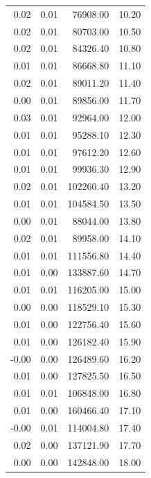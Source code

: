 \begin{tabular}{rrrr}
0.02 & 0.01 & 76908.00 & 10.20 \\
0.02 & 0.01 & 80703.00 & 10.50 \\
0.02 & 0.01 & 84326.40 & 10.80 \\
0.01 & 0.01 & 86668.80 & 11.10 \\
0.02 & 0.01 & 89011.20 & 11.40 \\
0.00 & 0.01 & 89856.00 & 11.70 \\
0.03 & 0.01 & 92964.00 & 12.00 \\
0.01 & 0.01 & 95288.10 & 12.30 \\
0.01 & 0.01 & 97612.20 & 12.60 \\
0.01 & 0.01 & 99936.30 & 12.90 \\
0.02 & 0.01 & 102260.40 & 13.20 \\
0.01 & 0.01 & 104584.50 & 13.50 \\
0.00 & 0.01 & 88044.00 & 13.80 \\
0.02 & 0.01 & 89958.00 & 14.10 \\
0.01 & 0.01 & 111556.80 & 14.40 \\
0.01 & 0.00 & 133887.60 & 14.70 \\
0.01 & 0.01 & 116205.00 & 15.00 \\
0.00 & 0.00 & 118529.10 & 15.30 \\
0.01 & 0.00 & 122756.40 & 15.60 \\
0.01 & 0.00 & 126182.40 & 15.90 \\
-0.00 & 0.00 & 126489.60 & 16.20 \\
0.01 & 0.00 & 127825.50 & 16.50 \\
0.01 & 0.01 & 106848.00 & 16.80 \\
0.01 & 0.00 & 160466.40 & 17.10 \\
-0.00 & 0.01 & 114004.80 & 17.40 \\
0.02 & 0.00 & 137121.90 & 17.70 \\
0.00 & 0.00 & 142848.00 & 18.00 \\
\bottomrule
\end{tabular}
